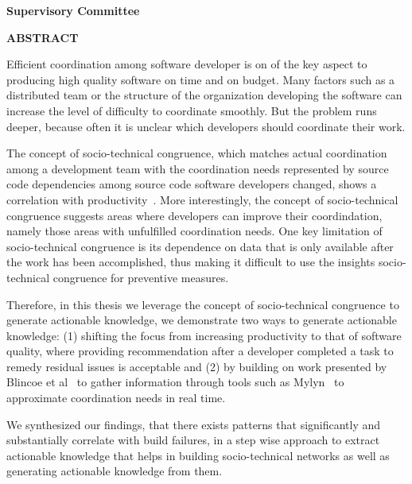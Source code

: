 \newpage
{}

\noindent \textbf{Supervisory Committee}
\tpbreak
\panel

\begin{center}
\textbf{ABSTRACT}
\end{center}
Efficient coordination among software developer is on of the key aspect to producing high quality software on time and on budget.
Many factors such as a distributed team or the structure of the organization developing the software can increase the level of difficulty to coordinate smoothly.
But the problem runs deeper, because often it is unclear which developers should coordinate their work.

The concept of socio-technical congruence, which matches actual coordination among a development team with the coordination needs represented by source code dependencies among source code software developers changed, shows a correlation with productivity~\cite{cataldo:cscw:2006}.
More interestingly, the concept of socio-technical congruence suggests areas where developers can improve their coordindation, namely those areas with unfulfilled coordination needs.
One key limitation of socio-technical congruence is its dependence on data that is only available after the work has been accomplished, thus making it difficult to use the insights socio-technical congruence for preventive measures.

Therefore, in this thesis we leverage the concept of socio-technical congruence to generate actionable knowledge, we demonstrate two ways to generate actionable knowledge: (1) shifting the focus from increasing productivity to that of software quality, where providing recommendation after a developer completed a task to remedy residual issues is acceptable and (2) by building on work presented by Blincoe et al~\cite{blincoe:cscw:2012} to gather information through tools such as Mylyn~\cite{kersten:aosd:2005} to approximate coordination needs in real time.

We synthesized our findings, that there exists patterns that significantly and substantially correlate with build failures, in a step wise approach to extract actionable knowledge that helps in building socio-technical networks as well as generating actionable knowledge from them.
